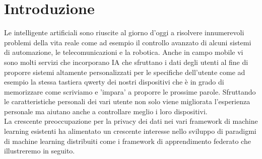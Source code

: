 \chapter{Introduzione}\label{ch:introduzione}
Le intelligente artificiali sono riuscite al giorno d'oggi a risolvere innumerevoli problemi della vita reale come ad esempio il controllo avanzato di alcuni sistemi di automazione, le telecomunicazioni e la robotica. Anche in campo mobile vi sono molti servizi che incorporano IA che sfruttano i dati degli utenti al fine di proporre sistemi altamente personalizzati per le specifiche dell'utente come ad esempio la stessa tastiera qwerty dei nostri dispositivi che è in grado di memorizzare come scriviamo e 'impara' a proporre le prossime parole. Sfruttando le caratteristiche personali dei vari utente  non solo viene migliorata l'esperienza personale ma aiutano anche a controllare meglio i loro dispositivi. \\
La crescente preoccupazione per la privacy dei dati nei vari framework di machine learning esistenti ha alimentato un crescente interesse nello sviluppo di paradigmi di machine learning distribuiti come i framework di apprendimento federato che illustreremo in seguito.